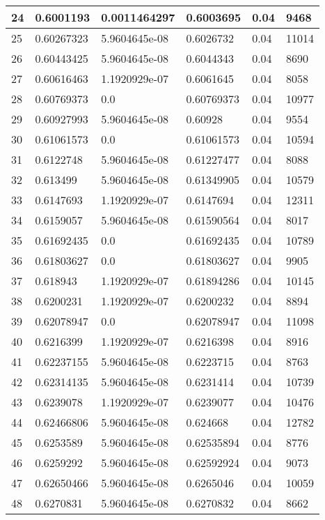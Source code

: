 \begin{longtable}{|l|l|l|l|l|l|}
24 & 0.6001193 & 0.0011464297 & 0.6003695 & 0.04 & 9468 \\ \hline 
25 & 0.60267323 & 5.9604645e-08 & 0.6026732 & 0.04 & 11014 \\ \hline 
26 & 0.60443425 & 5.9604645e-08 & 0.6044343 & 0.04 & 8690 \\ \hline 
27 & 0.60616463 & 1.1920929e-07 & 0.6061645 & 0.04 & 8058 \\ \hline 
28 & 0.60769373 & 0.0 & 0.60769373 & 0.04 & 10977 \\ \hline 
29 & 0.60927993 & 5.9604645e-08 & 0.60928 & 0.04 & 9554 \\ \hline 
30 & 0.61061573 & 0.0 & 0.61061573 & 0.04 & 10594 \\ \hline 
31 & 0.6122748 & 5.9604645e-08 & 0.61227477 & 0.04 & 8088 \\ \hline 
32 & 0.613499 & 5.9604645e-08 & 0.61349905 & 0.04 & 10579 \\ \hline 
33 & 0.6147693 & 1.1920929e-07 & 0.6147694 & 0.04 & 12311 \\ \hline 
34 & 0.6159057 & 5.9604645e-08 & 0.61590564 & 0.04 & 8017 \\ \hline 
35 & 0.61692435 & 0.0 & 0.61692435 & 0.04 & 10789 \\ \hline 
36 & 0.61803627 & 0.0 & 0.61803627 & 0.04 & 9905 \\ \hline 
37 & 0.618943 & 1.1920929e-07 & 0.61894286 & 0.04 & 10145 \\ \hline 
38 & 0.6200231 & 1.1920929e-07 & 0.6200232 & 0.04 & 8894 \\ \hline 
39 & 0.62078947 & 0.0 & 0.62078947 & 0.04 & 11098 \\ \hline 
40 & 0.6216399 & 1.1920929e-07 & 0.6216398 & 0.04 & 8916 \\ \hline 
41 & 0.62237155 & 5.9604645e-08 & 0.6223715 & 0.04 & 8763 \\ \hline 
42 & 0.62314135 & 5.9604645e-08 & 0.6231414 & 0.04 & 10739 \\ \hline 
43 & 0.6239078 & 1.1920929e-07 & 0.6239077 & 0.04 & 10476 \\ \hline 
44 & 0.62466806 & 5.9604645e-08 & 0.624668 & 0.04 & 12782 \\ \hline 
45 & 0.6253589 & 5.9604645e-08 & 0.62535894 & 0.04 & 8776 \\ \hline 
46 & 0.6259292 & 5.9604645e-08 & 0.62592924 & 0.04 & 9073 \\ \hline 
47 & 0.62650466 & 5.9604645e-08 & 0.6265046 & 0.04 & 10059 \\ \hline 
48 & 0.6270831 & 5.9604645e-08 & 0.6270832 & 0.04 & 8662 \\ \hline 

\end{longtable}
